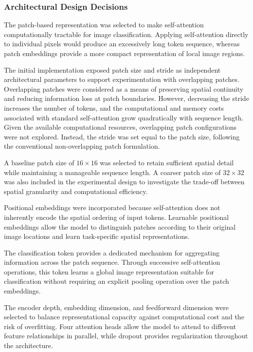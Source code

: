 \documentclass[conference]{IEEEtran}
\begin{document}
\subsubsection{Architectural Design Decisions}

The patch-based representation was selected to make
self-attention computationally tractable for image
classification. Applying self-attention directly to
individual pixels would produce an excessively long
token sequence, whereas patch embeddings provide a
more compact representation of local image regions.

The initial implementation exposed patch size and
stride as independent architectural parameters to
support experimentation with overlapping patches.
Overlapping patches were considered as a means of
preserving spatial continuity and reducing information
loss at patch boundaries. However, decreasing the
stride increases the number of tokens, and the
computational and memory costs associated with standard
self-attention grow quadratically with sequence length.
Given the available computational resources, overlapping
patch configurations were not explored. Instead, the
stride was set equal to the patch size, following the
conventional non-overlapping patch formulation.

A baseline patch size of $16 \times 16$ was selected
to retain sufficient spatial detail while maintaining
a manageable sequence length. A coarser patch size
of $32 \times 32$ was also included in the experimental
design to investigate the trade-off between spatial
granularity and computational efficiency.

Positional embeddings were incorporated because
self-attention does not inherently encode the spatial
ordering of input tokens. Learnable positional
embeddings allow the model to distinguish patches
according to their original image locations and
learn task-specific spatial representations.

The classification token provides a dedicated mechanism
for aggregating information across the patch sequence.
Through successive self-attention operations, this
token learns a global image representation suitable
for classification without requiring an explicit
pooling operation over the patch embeddings.

The encoder depth, embedding dimension, and
feedforward dimension were selected to balance
representational capacity against computational cost
and the risk of overfitting. Four attention heads
allow the model to attend to different feature
relationships in parallel, while dropout provides
regularization throughout the architecture.
\end{document}
